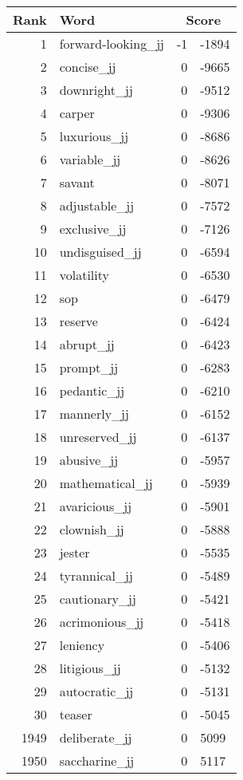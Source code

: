 \begin{longtable}[!htbp]{| rlr@{.}l |}
    \hline
    \textbf{Rank} & \textbf{Word} & \multicolumn{2}{c|}{\textbf{Score}} \\
    \hline
    \endhead
    1 & forward-looking\_jj & -1 & -1894 \\
    2 & concise\_jj & 0 & -9665 \\
    3 & downright\_jj & 0 & -9512 \\
    4 & carper & 0 & -9306 \\
    5 & luxurious\_jj & 0 & -8686 \\
    6 & variable\_jj & 0 & -8626 \\
    7 & savant & 0 & -8071 \\
    8 & adjustable\_jj & 0 & -7572 \\
    9 & exclusive\_jj & 0 & -7126 \\
    10 & undisguised\_jj & 0 & -6594 \\
    11 & volatility & 0 & -6530 \\
    12 & sop & 0 & -6479 \\
    13 & reserve & 0 & -6424 \\
    14 & abrupt\_jj & 0 & -6423 \\
    15 & prompt\_jj & 0 & -6283 \\
    16 & pedantic\_jj & 0 & -6210 \\
    17 & mannerly\_jj & 0 & -6152 \\
    18 & unreserved\_jj & 0 & -6137 \\
    19 & abusive\_jj & 0 & -5957 \\
    20 & mathematical\_jj & 0 & -5939 \\
    21 & avaricious\_jj & 0 & -5901 \\
    22 & clownish\_jj & 0 & -5888 \\
    23 & jester & 0 & -5535 \\
    24 & tyrannical\_jj & 0 & -5489 \\
    25 & cautionary\_jj & 0 & -5421 \\
    26 & acrimonious\_jj & 0 & -5418 \\
    27 & leniency & 0 & -5406 \\
    28 & litigious\_jj & 0 & -5132 \\
    29 & autocratic\_jj & 0 & -5131 \\
    30 & teaser & 0 & -5045 \\
    1949 & deliberate\_jj & 0 & 5099 \\
    1950 & saccharine\_jj & 0 & 5117 \\

\end{longtable}
